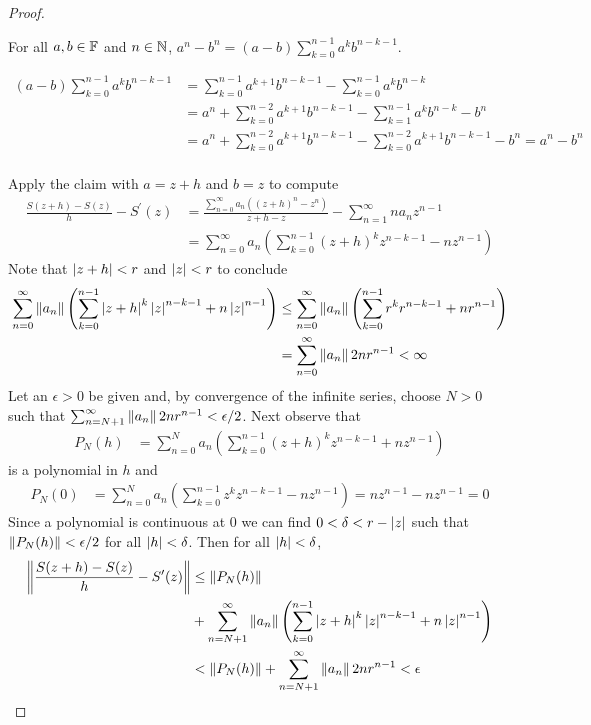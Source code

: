 \begin{proof}
\begin{clm}For all $a,b \in \mathbb{F}$ and $n \in \mathbb{N}$, $a^n - b^n
  =  (a - b) \sum_{k=0}^{n-1} a^k b^{n-k-1}$.
\end{clm}
\begin{align*}
  (a - b) \sum_{k=0}^{n-1} a^k b^{n-k-1}
  &= \sum_{k=0}^{n-1} a^{k+1} b^{n-k-1} - \sum_{k=0}^{n-1} a^{k}
    b^{n-k} \\
  &= a^n + \sum_{k=0}^{n-2} a^{k+1} b^{n-k-1} - \sum_{k=1}^{n-1} a^{k}
    b^{n-k} - b^n\\
  &= a^n + \sum_{k=0}^{n-2} a^{k+1} b^{n-k-1} - \sum_{k=0}^{n-2} a^{k+1}
    b^{n-k-1} - b^n = a^n - b^n\\
\end{align*}

Apply the claim with $a = z+h$ and $b=z$ to compute
\begin{align*}
  \frac{S(z+h) - S(z)}{h} - S^\prime(z)
  &= \frac{\sum_{n=0}^\infty a_n\left( (z+h)^n  - z^n\right)}{z+h - z}
    - \sum_{n=1}^\infty n a_n z^{n-1} \\
  &= \sum_{n=0}^\infty a_n \left( \sum_{k=0}^{n-1} (z+h)^k z^{n-k-1}
    - n z^{n-1} \right)
\end{align*}
Note that $\left \vert z+h \right \vert < r$ and $\left \vert z \right \vert < r$ to conclude
\begin{align*}
  \sum_{n=0}^\infty \left \lVert a_n \right \rVert  \left( \sum_{k=0}^{n-1} \left \vert z+h \right \vert^k \left \vert z \right \vert^{n-k-1} + n \left \vert z \right \vert^{n-1} \right) 
  &\leq \sum_{n=0}^\infty \left \lVert a_n \right \rVert  \left( \sum_{k=0}^{n-1} r^k r^{n-k-1} + n r^{n-1} \right) \\
  &= \sum_{n=0}^\infty \left \lVert a_n \right \rVert  2n r^{n-1} < \infty
\end{align*}
Let an $\epsilon>0$ be given and, by convergence of the infinite series,  choose $N>0$ such that
$\sum_{n=N+1}^\infty \left \lVert a_n \right \rVert  2n r^{n-1} < \epsilon/2$.  Next
observe that
\begin{align*}
  P_N(h) &= \sum_{n=0}^N a_n  \left( \sum_{k=0}^{n-1} (z+h)^k z^{n-k-1}
           + n z^{n-1} \right)
\end{align*}
is a polynomial in $h$ and
\begin{align*}
 P_N(0) &= \sum_{n=0}^N a_n  \left( \sum_{k=0}^{n-1} z^k z^{n-k-1}
           - n z^{n-1} \right) = n z^{n-1} - n z^{n-1} = 0
\end{align*}
Since a polynomial is continuous at $0$ we can find $0 < \delta < r -
\left \vert z \right \vert$ such that $\left \lVert P_N(h) \right \rVert < \epsilon/2$ for all $\left \vert h \right \vert <
\delta$.  Then for all $\left \vert h \right \vert < \delta$,
\begin{align*}
  \left \lVert \frac{S(z+h) - S(z)}{h} - S^\prime(z) \right \rVert &\leq \left \lVert P_N(h) \right \rVert \\
  &+ \sum_{n=N+1}^\infty \left \lVert a_n \right \rVert  \left( \sum_{k=0}^{n-1} \left \vert z+h \right \vert^k \left \vert z \right \vert^{n-k-1}
                                                 + n \left \vert z \right \vert^{n-1} \right) \\
  &< \left \lVert P_N(h) \right \rVert + \sum_{n=N+1}^\infty \left \lVert a_n \right \rVert  2n r^{n-1} <
  \epsilon
\end{align*}
\end{proof}

